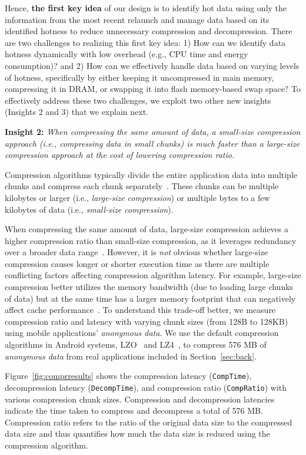 Hence, \textbf{the first key idea} of our design is to identify hot data using only the information from the most recent relaunch and manage data based on its identified hotness to reduce unnecessary compression and decompression. There are two challenges to realizing this first key idea: 1) How can we identify data hotness dynamically with low overhead (e.g., CPU time and energy consumption)? and 2) How can we effectively handle data based on varying levels of hotness, specifically by either keeping it uncompressed in main memory, compressing it in DRAM, or swapping it into flash memory-based swap space?
To effectively address these two challenges, we exploit two other new insights (Insights 2 and 3) that we explain next.

\noindent\textbf{Insight 2:} \textit{When compressing the same amount of data, a small-size compression approach (i.e., compressing data in small chunks) is much faster than a large-size compression approach at the cost of lowering compression ratio.}

Compression algorithms typically divide the entire application data into multiple chunks and compress each chunk separately~\cite{LZ4,LZO, mao2022trace}. These chunks can be multiple kilobytes or larger (i.e., \emph{large-size compression}) or multiple bytes to a few kilobytes of data (i.e., \emph{small-size compression}).

When compressing the same amount of data, large-size compression achieves a higher compression ratio than small-size compression, as it leverages redundancy over a broader data range~\cite{mahoney2011large}.  However, it is \emph{not} obvious whether large-size compression causes longer or shorter execution time as there are multiple conflicting factors affecting compression algorithm latency. For example, large-size compression better utilizes the memory bandwidth (due to loading large chunks of data) but at the same time has a larger memory footprint that can negatively affect cache performance~\cite{young2018cram,carvalho2021understanding}. To understand this trade-off better, we measure compression ratio and latency with varying chunk sizes (from 128B to 128KB) using mobile applications' \emph{anonymous data}. We use the default compression algorithms in Android systems, LZO~\cite{LZO} and LZ4~\cite{LZ4}, to compress 576 MB of \emph{anonymous data} from real applications included in Section~\ref{sec:back}.


Figure~\ref{fig:comprresults} shows the compression latency (\texttt{CompTime}), decompression latency (\texttt{DecompTime}), and compression ratio (\texttt{CompRatio}) with various compression chunk sizes. Compression and decompression latencies indicate the time taken to compress and decompress a total of 576 MB. Compression ratio refers to the ratio of the original data size to the compressed data size and thus quantifies how much the data size is reduced using the compression algorithm.

